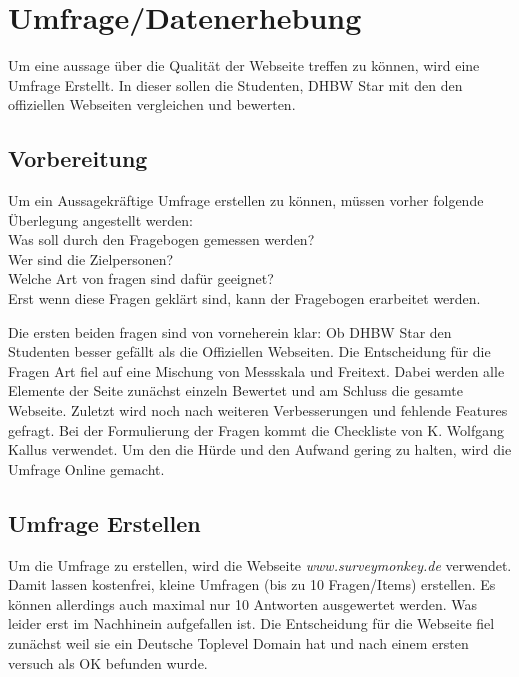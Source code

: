 \chapter{Umfrage/Datenerhebung}
Um eine aussage über die Qualität der Webseite treffen zu können, wird eine Umfrage Erstellt. In dieser sollen die Studenten, DHBW Star mit den den offiziellen Webseiten vergleichen und bewerten.

\section{Vorbereitung}
Um ein Aussagekräftige Umfrage erstellen zu können, müssen vorher folgende Überlegung angestellt werden:\\
Was soll durch den Fragebogen gemessen werden?\\
Wer sind die Zielpersonen?\\
Welche Art von fragen sind dafür geeignet?\\
Erst wenn diese Fragen geklärt sind, kann der Fragebogen erarbeitet werden.

Die ersten beiden fragen sind von vorneherein klar:
Ob DHBW Star den Studenten besser gefällt als die Offiziellen Webseiten.
Die Entscheidung für die Fragen Art fiel auf eine Mischung von Messskala und Freitext.
Dabei werden alle Elemente der Seite zunächst einzeln Bewertet und am Schluss die gesamte Webseite.
Zuletzt wird noch nach weiteren Verbesserungen und fehlende Features gefragt.
Bei der Formulierung der Fragen kommt die Checkliste von K. Wolfgang Kallus verwendet.
Um den die Hürde und den Aufwand gering zu halten, wird die Umfrage Online gemacht.

\section{Umfrage Erstellen}
Um die Umfrage zu erstellen, wird die Webseite \emph{www.surveymonkey.de} verwendet. Damit lassen kostenfrei, kleine Umfragen (bis zu 10 Fragen/Items) erstellen. Es können allerdings auch maximal nur 10 Antworten ausgewertet werden. Was leider erst im Nachhinein aufgefallen ist.
Die Entscheidung für die Webseite fiel zunächst weil sie ein Deutsche Toplevel Domain hat und nach einem ersten versuch als OK befunden wurde.

